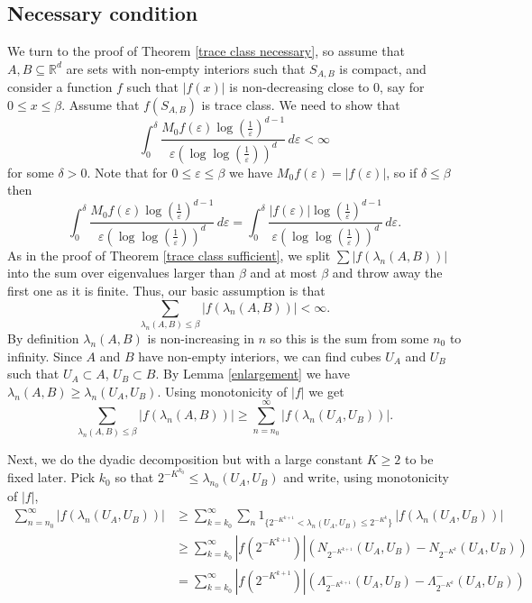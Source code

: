 \documentclass[12pt]{amsart}
\numberwithin{equation}{section}
\newcommand{\R}{\mathbb{R}}
\newcommand{\eps}{\varepsilon}
\newcommand{\abs}[1]{| #1 |}
\begin{document}
\subsection{Necessary condition}
We turn to the proof of Theorem \ref{trace class necessary}, so assume that $A, B \subseteq \R^d$ are sets with non-empty interiors such that $S_{A,B}$ is compact, and consider a function $f$ such that $\abs{f(x)}$ is non-decreasing close to $0$, say for $0\le x\le\beta$. Assume that $f(S_{A,B})$ is trace class. We need to show that 
\[
\int_0^{\delta} \frac{M_0 f(\eps) \log\left(\frac{1}{\eps}\right)^{d-1}}{\eps\left(\log\log\left(\frac{1}{\eps}\right)\right)^d} \, d\eps < \infty
\]
for some $\delta > 0$. Note that for $0 \le \eps \le \beta$ we have $M_0f(\eps) = |f(\eps)|$, so if $\delta \le \beta$ then 
\[
\int_0^{\delta} \frac{M_0 f(\eps) \log\left(\frac{1}{\eps}\right)^{d-1}}{\eps\left(\log\log\left(\frac{1}{\eps}\right)\right)^d} \, d\eps = \int_0^{\delta} \frac{|f(\eps)| \log\left(\frac{1}{\eps}\right)^{d-1}}{\eps\left(\log\log\left(\frac{1}{\eps}\right)\right)^d} \, d\eps.
\]
As in the proof of Theorem \ref{trace class sufficient}, we split $\sum |f(\lambda_n(A,B))|$ into the sum over eigenvalues larger than $\beta$ and at most $\beta$ and throw away the first one as it is finite. Thus, our basic assumption is that
$$\sum_{\lambda_n(A,B)\leq \beta}|f(\lambda_n(A,B))| < \infty.$$
By definition $\lambda_n(A,B)$ is non-increasing in $n$ so this is the sum from some $n_0$ to infinity. Since $A$ and $B$ have non-empty interiors, we can find cubes $U_A$ and $U_B$ such that $U_A\subset A$, $U_B\subset B$. By Lemma \ref{enlargement} we have $\lambda_n(A,B)\ge \lambda_n(U_A, U_B)$. Using monotonicity of $|f|$ we get
$$\sum_{\lambda_n(A,B)\leq \beta}|f(\lambda_n(A,B))|  \ge \sum_{n=n_0}^\infty |f(\lambda_n(U_A, U_B))|.$$

Next, we do the dyadic decomposition but with a large constant $K\geq 2$ to be fixed later. Pick $k_0$ so that $2^{-K^{k_0}} \leq \lambda_{n_0}(U_A,U_B)$ and write, using 
monotonicity of $|f|$,
\begin{align*}
\sum_{n=n_0}^\infty |f(\lambda_n(U_A, U_B))| &\ge \sum_{k=k_0}^\infty \sum_n 1_{\{ 2^{-K^{k+1}}<\lambda_n(U_A,U_B) \le 2^{-K^k} \}} \, |f(\lambda_n(U_A,U_B))|\\
&\geq \sum_{k=k_0}^\infty \left|f\left(2^{-K^{k+1}}\right)\right| \left( N_{2^{-K^{k+1}}}(U_A, U_B) - N_{2^{-K^{k}}}(U_A, U_B)\right)\\
& = \sum_{k=k_0}^\infty \left|f\left(2^{-K^{k+1}}\right)\right| \left( \Lambda^-_{2^{-K^{k+1}}}(U_A, U_B) - \Lambda^-_{2^{-K^{k}}}(U_A, U_B)\right)
\end{align*}
\end{document}

